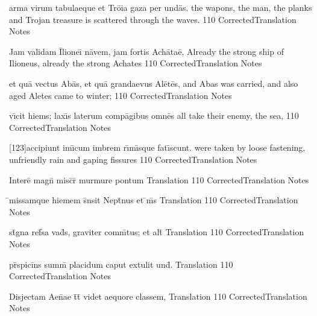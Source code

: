 \documentclass[]{book}
\begin{document}
	\newpage

	\latline
	  {arma virum tabulaeque et Tr\={\macron o}ia gaza per und\={\macron a}s.}
	  { the wapons, the man, the planks and Trojan treasure is scattered through the waves. }
	  {110}
	  { CorrectedTranslation }
	  { Notes }


	\latline
	  {Jam validam \={\macron I}lione\={\macron \i} n\={\macron a}vem, jam fortis Ach\={\macron a}ta\={\macron e},}
	  { Already the strong ship of Ilioneus, already the strong Achates }
	  {110}
	  { CorrectedTranslation }
	  { Notes }


	\latline
	  {et qu\={\macron a} vectus Ab\={\macron a}s, et qu\={\macron a} grandaevus Al\={\macron e}t\={\macron e}s,}
	  { and Abas was carried, and also aged Aletes came to winter;  }
	  {110}
	  { CorrectedTranslation }
	  { Notes }


	\newpage

	\latline
	  {v\={\macron \i}cit hiems; lax\={\macron \i}s laterum comp\={\macron a}gibus omn\={\macron e}s}
	  { all  take their enemy, the sea, }
	  {110}
	  { CorrectedTranslation }
	  { Notes }


	\latline
	  {[123]accipiunt im\={\macron \i}cum imbrem r\={\macron \i}m\={\macron \i}sque fat\={\macron \i}scunt.}
	  {  were taken by loose fastening, unfriendly rain and gaping fissures }
	  {110}
	  { CorrectedTranslation }
	  { Notes }

%

\latline
  {Intere\={} magn\={} misc\={}r\={\macron {\i}} murmure pontum}
  { Translation }
  {110}
  { CorrectedTranslation }
  { Notes }


\latline
  {\={}missamque hiemem s\={}nsit Nept\={}nus et \={\macron {\i}}m\={\macron {\i}}s}
  { Translation }
  {110}
  { CorrectedTranslation }
  { Notes }


\latline
  {st\={}gna ref\={}sa vad\={\macron {\i}}s, graviter comm\={}tus; et alt\={}}
  { Translation }
  {110}
  { CorrectedTranslation }
  { Notes }



\newpage

\latline
  {pr\={}spici\={}ns summ\={} placidum caput extulit und\={}.}
  { Translation }
  {110}
  { CorrectedTranslation }
  { Notes }


\latline
  {Disjectam Aen\={}ae t\={}t\={} videt aequore classem,}
  { Translation }
  {110}
  { CorrectedTranslation }
  { Notes }
\end{document}

